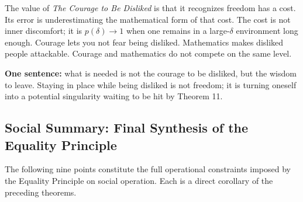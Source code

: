 \documentclass[12pt,a4paper]{article}
\theoremstyle{remark}
\begin{document}
The value of \textit{The Courage to Be Disliked} is that it recognizes freedom has a cost. Its error is underestimating the mathematical form of that cost. The cost is not inner discomfort; it is $p(\delta) \to 1$ when one remains in a large-$\delta$ environment long enough. Courage lets you not fear being disliked. Mathematics makes disliked people attackable. Courage and mathematics do not compete on the same level.

\textbf{One sentence:} what is needed is not the courage to be disliked, but the wisdom to leave. Staying in place while being disliked is not freedom; it is turning oneself into a potential singularity waiting to be hit by Theorem 11.

\subsection{Social Summary: Final Synthesis of the Equality Principle}

The following nine points constitute the full operational constraints imposed by the Equality Principle on social operation. Each is a direct corollary of the preceding theorems.
\end{document}
